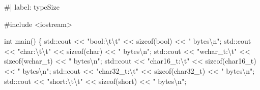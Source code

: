 \documentclass[
  letterpaper,
  DIV=11,
  numbers=noendperiod]{scrreprt}
\newenvironment{Shaded}{\begin{snugshade}}{\end{snugshade}}
\newcommand{\CommentTok}[1]{\textcolor[rgb]{0.37,0.37,0.37}{#1}}
\newcommand{\ErrorTok}[1]{\textcolor[rgb]{0.68,0.00,0.00}{#1}}
\newcommand{\FunctionTok}[1]{\textcolor[rgb]{0.28,0.35,0.67}{#1}}
\newcommand{\NormalTok}[1]{\textcolor[rgb]{0.00,0.23,0.31}{#1}}
\newcommand{\SpecialCharTok}[1]{\textcolor[rgb]{0.37,0.37,0.37}{#1}}
\newcommand{\StringTok}[1]{\textcolor[rgb]{0.13,0.47,0.30}{#1}}
\begin{document}
\begin{Shaded}
\begin{Highlighting}[]
\CommentTok{\#| label: typeSize}

\CommentTok{\#include \textless{}iostream\textgreater{}}

\NormalTok{int }\FunctionTok{main}\NormalTok{()}
\NormalTok{\{}
\NormalTok{    std}\SpecialCharTok{::}\NormalTok{cout }\SpecialCharTok{\textless{}}\ErrorTok{\textless{}} \StringTok{"bool:}\SpecialCharTok{\textbackslash{}t\textbackslash{}t}\StringTok{"} \SpecialCharTok{\textless{}}\ErrorTok{\textless{}} \FunctionTok{sizeof}\NormalTok{(bool) }\SpecialCharTok{\textless{}}\ErrorTok{\textless{}} \StringTok{" bytes}\SpecialCharTok{\textbackslash{}n}\StringTok{"}\NormalTok{;}
\NormalTok{    std}\SpecialCharTok{::}\NormalTok{cout }\SpecialCharTok{\textless{}}\ErrorTok{\textless{}} \StringTok{"char:}\SpecialCharTok{\textbackslash{}t\textbackslash{}t}\StringTok{"} \SpecialCharTok{\textless{}}\ErrorTok{\textless{}} \FunctionTok{sizeof}\NormalTok{(char) }\SpecialCharTok{\textless{}}\ErrorTok{\textless{}} \StringTok{" bytes}\SpecialCharTok{\textbackslash{}n}\StringTok{"}\NormalTok{;}
\NormalTok{    std}\SpecialCharTok{::}\NormalTok{cout }\SpecialCharTok{\textless{}}\ErrorTok{\textless{}} \StringTok{"wchar\_t:}\SpecialCharTok{\textbackslash{}t}\StringTok{"} \SpecialCharTok{\textless{}}\ErrorTok{\textless{}} \FunctionTok{sizeof}\NormalTok{(wchar\_t) }\SpecialCharTok{\textless{}}\ErrorTok{\textless{}} \StringTok{" bytes}\SpecialCharTok{\textbackslash{}n}\StringTok{"}\NormalTok{;}
\NormalTok{    std}\SpecialCharTok{::}\NormalTok{cout }\SpecialCharTok{\textless{}}\ErrorTok{\textless{}} \StringTok{"char16\_t:}\SpecialCharTok{\textbackslash{}t}\StringTok{"} \SpecialCharTok{\textless{}}\ErrorTok{\textless{}} \FunctionTok{sizeof}\NormalTok{(char16\_t) }\SpecialCharTok{\textless{}}\ErrorTok{\textless{}} \StringTok{" bytes}\SpecialCharTok{\textbackslash{}n}\StringTok{"}\NormalTok{;}
\NormalTok{    std}\SpecialCharTok{::}\NormalTok{cout }\SpecialCharTok{\textless{}}\ErrorTok{\textless{}} \StringTok{"char32\_t:}\SpecialCharTok{\textbackslash{}t}\StringTok{"} \SpecialCharTok{\textless{}}\ErrorTok{\textless{}} \FunctionTok{sizeof}\NormalTok{(char32\_t) }\SpecialCharTok{\textless{}}\ErrorTok{\textless{}} \StringTok{" bytes}\SpecialCharTok{\textbackslash{}n}\StringTok{"}\NormalTok{;}
\NormalTok{    std}\SpecialCharTok{::}\NormalTok{cout }\SpecialCharTok{\textless{}}\ErrorTok{\textless{}} \StringTok{"short:}\SpecialCharTok{\textbackslash{}t\textbackslash{}t}\StringTok{"} \SpecialCharTok{\textless{}}\ErrorTok{\textless{}} \FunctionTok{sizeof}\NormalTok{(short) }\SpecialCharTok{\textless{}}\ErrorTok{\textless{}} \StringTok{" bytes}\SpecialCharTok{\textbackslash{}n}\StringTok{"}\NormalTok{;}

\end{Highlighting}
\end{Shaded}
\end{document}
